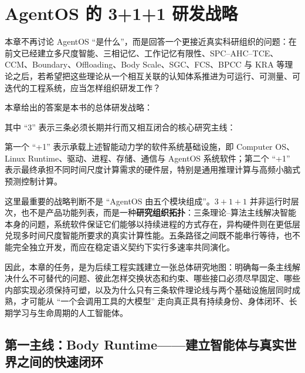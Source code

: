 \chapter{AgentOS 的 3+1+1 研发战略}
\label{chap:agentos-3plus1plus1-roadmap}

\begin{chapterlead}
本章不再讨论 AgentOS ``是什么''，而是回答一个更接近真实科研组织的问题：在前文已经建立多尺度智能、三相记忆、工作记忆有限性、SPC--AHC--TCE、CCM、Boundary、Offloading、Body Scale、SGC、FCS、BPCC 与 KRA 等理论之后，若希望把这些理论从一个相互关联的认知体系推进为可运行、可测量、可迭代的工程系统，应当怎样组织研发工作？

本章给出的答案是本书的总体研发战略：
\begin{statementbox}
\centering
{}
\end{statementbox}
其中 ``3'' 表示三条必须长期并行而又相互闭合的核心研究主线：
\begin{statementbox}
\centering
{}
\end{statementbox}
第一个 ``+1'' 表示承载上述智能动力学的软件系统基础设施，即 Computer OS、Linux Runtime、驱动、进程、存储、通信与 AgentOS 系统软件；第二个 ``+1'' 表示最终承担不同时间尺度计算需求的硬件层，特别是通用推理计算与高频小脑式预测控制计算。

这里最重要的战略判断不是 ``AgentOS 由五个模块组成''。$3+1+1$ 并非运行时层次，也不是产品功能列表，而是一种\textbf{研究组织拓扑}：三条理论--算法主线解决智能本身的问题，系统软件保证它们能够以持续进程的方式存在，异构硬件则在更低层兑现多时间尺度智能所要求的真实计算性能。五条路径之间既不能串行等待，也不能完全独立开发，而应在稳定语义契约下实行多速率共同演化。

因此，本章的任务，是为后续工程实践建立一张总体研究地图：明确每一条主线解决什么不可替代的问题、彼此怎样交换状态和约束、哪些接口必须尽早固定、哪些内部实现必须保持可塑，以及为什么只有三条软件理论线与两个基础设施层同时成熟，才可能从 ``一个会调用工具的大模型'' 走向真正具有持续身份、身体闭环、长期学习与生命周期的人工智能体。
\end{chapterlead}

\section{第一主线：Body Runtime——建立智能体与真实世界之间的快速闭环}
\label{sec:roadmap-body-runtime}

